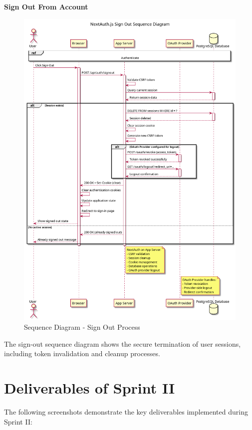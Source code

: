 \textbf{Sign Out From Account}
\begin{figure}[H]
    \centering
    \includegraphics[width=1.0\textwidth]{conception/SprintII/sequence_diagrams/sequence_authentication_1_4_SignoutFromAccount.png}
    \caption{Sequence Diagram - Sign Out Process}
    \label{fig:seq_signout}
\end{figure}

The sign-out sequence diagram shows the secure termination of user sessions, including token invalidation and cleanup processes.

\section{Deliverables of Sprint II}

The following screenshots demonstrate the key deliverables implemented during Sprint II:

